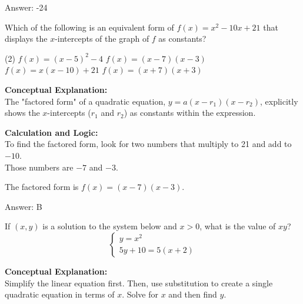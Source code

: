 \documentclass[11pt,paper=a4,answers]{exam}
\begin{document}
\begin{questions}
\begin{solution}
Answer: \colorbox{yellow!100}{-24}
\end{solution}

\vspace{40pt}

\question
Which of the following is an equivalent form of $f(x) = x^2 - 10x + 21$ that displays the $x$-intercepts of the graph of $f$ as constants?
\begin{tasks}(2)
    \task $f(x) = (x-5)^2 - 4$
    \task $f(x) = (x-7)(x-3)$
    \task $f(x) = x(x-10) + 21$
    \task $f(x) = (x+7)(x+3)$
\end{tasks}

\begin{solution}
\textbf{Conceptual Explanation:} \\
The "factored form" of a quadratic equation, $y = a(x-r_1)(x-r_2)$, explicitly shows the $x$-intercepts ($r_1$ and $r_2$) as constants within the expression.

\vspace{20pt}

\textbf{Calculation and Logic:} \\
To find the factored form, look for two numbers that multiply to 21 and add to $-10$. \\
Those numbers are $-7$ and $-3$.

\vspace{10pt}

The factored form is $f(x) = (x-7)(x-3)$.

\vspace{25pt}

Answer: \colorbox{yellow!100}{B}
\end{solution}

\vspace{40pt}

\question
If $(x, y)$ is a solution to the system below and $x > 0$, what is the value of $xy$?
\[ \begin{cases} y = x^2 \\ 5y + 10 = 5(x+2) \end{cases} \]

\begin{solution}
\textbf{Conceptual Explanation:} \\
Simplify the linear equation first. Then, use substitution to create a single quadratic equation in terms of $x$. Solve for $x$ and then find $y$.


\end{solution}
\end{questions}
\end{document}

